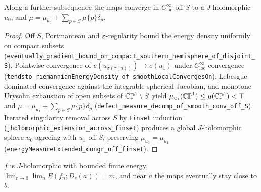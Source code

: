 \begin{theorem}
\label{cert_conc}
\leanok
{}
Along a further subsequence the maps converge in $C^\infty_{\mathrm{loc}}$ off $S$ to a
$J$-holomorphic $u_0$, and $\mu=\mu_{u_0}+\sum_{p\in S}\mu\{p\}\delta_p$.
\end{theorem}
\begin{proof}\leanok Off $S$, Portmanteau and $\varepsilon$-regularity bound the energy density uniformly on compact subsets (\texttt{eventually\_gradient\_bound\_on\_compact\_southern\_hemisphere\_of\_disjoint\_S}). Pointwise convergence of $e(u_{\sigma(\tau(n))})\to e(u_1)$ under $C^\infty_{\mathrm{loc}}$ convergence (\texttt{tendsto\_riemannianEnergyDensity\_of\_smoothLocalConvergesOn}), Lebesgue dominated convergence against the integrable spherical Jacobian, and monotone Urysohn exhaustion of open subsets of $\mathbb{CP}^1\setminus S$ yield $\mu_{u_1}(\mathbb{CP}^1)\le\mu(\mathbb{CP}^1)<\top$ and $\mu=\mu_{u_1}+\sum_{p\in S}\mu\{p\}\delta_p$ (\texttt{defect\_measure\_decomp\_of\_smooth\_conv\_off\_S}). Iterated singularity removal across $S$ by \texttt{Finset} induction (\texttt{jholomorphic\_extension\_across\_finset}) produces a global $J$-holomorphic sphere $u_0$ agreeing with $u_1$ off $S$, preserving $\mu_{u_0}=\mu_{u_1}$ (\texttt{energyMeasureExtended\_congr\_off\_finset}).\end{proof}

\begin{definition}
\label{def_defect_seq}
\leanok
{}
$f$ is $J$-holomorphic with bounded finite energy, $\lim_{r\to0}\lim_nE(f_n;D_r(a))=m$, and near $a$
the maps eventually stay close to $b$.
\end{definition}

